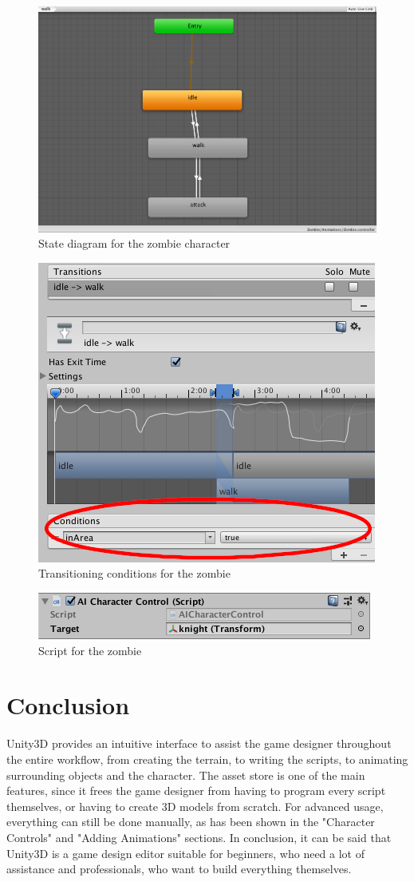 \documentclass[12pt, a4paper, titlepage]{article}
\begin{document}
\begin{figure}[htbp]
  \centering
  \includegraphics[width=.4\textwidth]{pictures/zombie_states}
  \caption{State diagram for the zombie character}
  \label{fig:adding_animations_zombie_states}
\end{figure}

\begin{figure}[htbp]
  \centering
  \includegraphics[width=.4\textwidth]{pictures/zombie_transition}
  \caption{Transitioning conditions for the zombie}
  \label{fig:adding_animations_zombie_transition}
\end{figure}

\begin{figure}[htbp]
  \centering
  \includegraphics[width=.4\textwidth]{pictures/zombie_script}
  \caption{Script for the zombie}
  \label{fig:adding_animations_zombie_script}
\end{figure}

\section{Conclusion}

Unity3D provides an intuitive interface to assist the game designer throughout the entire workflow, from creating the terrain, to writing the scripts, to animating surrounding objects and the character. The asset store is one of the main features, since it frees the game designer from having to program every script themselves, or having to create 3D models from scratch. For advanced usage, everything can still be done manually, as has been shown in the "Character Controls" and "Adding Animations" sections. In conclusion, it can be said that Unity3D is a game design editor suitable for beginners, who need a lot of assistance and professionals, who want to build everything themselves.
\end{document}
